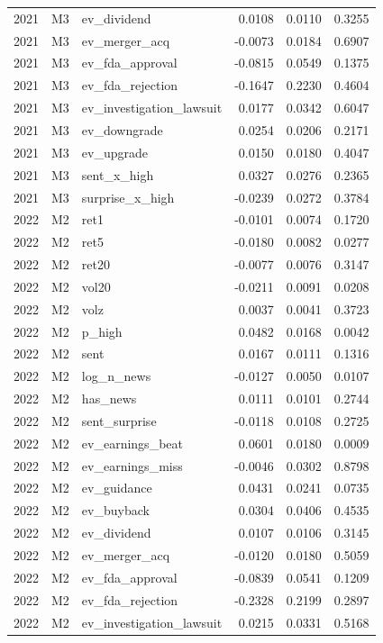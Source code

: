 \begin{tabular}{rllrrr}
2021 & M3 & ev\_dividend & 0.0108 & 0.0110 & 0.3255 \\
2021 & M3 & ev\_merger\_acq & -0.0073 & 0.0184 & 0.6907 \\
2021 & M3 & ev\_fda\_approval & -0.0815 & 0.0549 & 0.1375 \\
2021 & M3 & ev\_fda\_rejection & -0.1647 & 0.2230 & 0.4604 \\
2021 & M3 & ev\_investigation\_lawsuit & 0.0177 & 0.0342 & 0.6047 \\
2021 & M3 & ev\_downgrade & 0.0254 & 0.0206 & 0.2171 \\
2021 & M3 & ev\_upgrade & 0.0150 & 0.0180 & 0.4047 \\
2021 & M3 & sent\_x\_high & 0.0327 & 0.0276 & 0.2365 \\
2021 & M3 & surprise\_x\_high & -0.0239 & 0.0272 & 0.3784 \\
2022 & M2 & ret1 & -0.0101 & 0.0074 & 0.1720 \\
2022 & M2 & ret5 & -0.0180 & 0.0082 & 0.0277 \\
2022 & M2 & ret20 & -0.0077 & 0.0076 & 0.3147 \\
2022 & M2 & vol20 & -0.0211 & 0.0091 & 0.0208 \\
2022 & M2 & volz & 0.0037 & 0.0041 & 0.3723 \\
2022 & M2 & p\_high & 0.0482 & 0.0168 & 0.0042 \\
2022 & M2 & sent & 0.0167 & 0.0111 & 0.1316 \\
2022 & M2 & log\_n\_news & -0.0127 & 0.0050 & 0.0107 \\
2022 & M2 & has\_news & 0.0111 & 0.0101 & 0.2744 \\
2022 & M2 & sent\_surprise & -0.0118 & 0.0108 & 0.2725 \\
2022 & M2 & ev\_earnings\_beat & 0.0601 & 0.0180 & 0.0009 \\
2022 & M2 & ev\_earnings\_miss & -0.0046 & 0.0302 & 0.8798 \\
2022 & M2 & ev\_guidance & 0.0431 & 0.0241 & 0.0735 \\
2022 & M2 & ev\_buyback & 0.0304 & 0.0406 & 0.4535 \\
2022 & M2 & ev\_dividend & 0.0107 & 0.0106 & 0.3145 \\
2022 & M2 & ev\_merger\_acq & -0.0120 & 0.0180 & 0.5059 \\
2022 & M2 & ev\_fda\_approval & -0.0839 & 0.0541 & 0.1209 \\
2022 & M2 & ev\_fda\_rejection & -0.2328 & 0.2199 & 0.2897 \\
2022 & M2 & ev\_investigation\_lawsuit & 0.0215 & 0.0331 & 0.5168 \\

\end{tabular}
